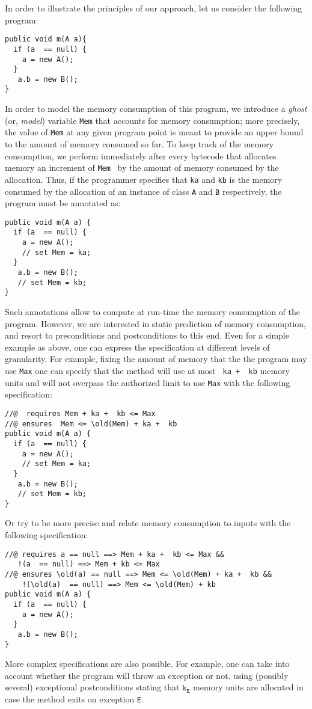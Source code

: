 In order to illustrate the principles of our approach, let us consider
the following program:

\begin{verbatim}
public void m(A a){
  if (a  == null) {
    a = new A();
  }  
   a.b = new B();
}
\end{verbatim}
In order to model the memory consumption of this program, we introduce
a {\em ghost} (or, {\em model}) variable \verb!Mem! that accounts for memory consumption; more
precisely, the value of \verb!Mem! at any given program point is meant
to provide an upper bound to the amount of memory consumed so far. To
keep track of the memory consumption, we perform immediately after every 
bytecode that allocates memory an increment of \verb!Mem! \ by the amount
of memory consumed by the allocation. Thus, if the programmer specifies
that \verb!ka! and \verb!kb! is the memory consumed by the allocation of 
an instance of class \verb!A! and  \verb!B! respectively, the program must
be annotated as:
\begin{verbatim} 
public void m(A a) {
  if (a  == null) {
    a = new A();
    // set Mem = ka;
  }  
   a.b = new B();
   // set Mem = kb;
}
\end{verbatim}
Such annotations allow to compute at run-time the memory consumption of 
the program. However, we are interested in static prediction of memory
consumption, and resort to preconditions and postconditions to this end.
Even for a simple example as above, one can express the specification
at different levels of granularity. For example, fixing the amount of memory that
the the program may use \verb!Max! one can specify that the method will use at most 
\verb! ka +  kb! memory units and will not overpass the authorized limit to use \verb!Max! with the following specification:
\begin{verbatim}
//@  requires Mem + ka +  kb <= Max 
//@ ensures  Mem <= \old(Mem) + ka +  kb     
public void m(A a) {
  if (a  == null) {
    a = new A();
    // set Mem = ka;
  }  
   a.b = new B();
   // set Mem = kb;
}
\end{verbatim}
Or try to be more precise and relate memory consumption to inputs with
the following specification:
\begin{verbatim}
//@ requires a == null ==> Mem + ka +  kb <= Max &&	 
   !(a  == null) ==> Mem + kb <= Max
//@ ensures \old(a) == null ==> Mem <= \old(Mem) + ka +  kb && 
    !(\old(a)  == null) ==> Mem <= \old(Mem) + kb    
public void m(A a) {
  if (a  == null) {
    a = new A();
  }  
   a.b = new B();
}
\end{verbatim}
More complex specifications are also possible. For example, one can
take into account whether the program will throw an exception or not.
using (possibly several) exceptional postconditions stating that
$\texttt{k}_{\texttt{E}}$ memory units are allocated in case the
method exits on exception \texttt{E}.



